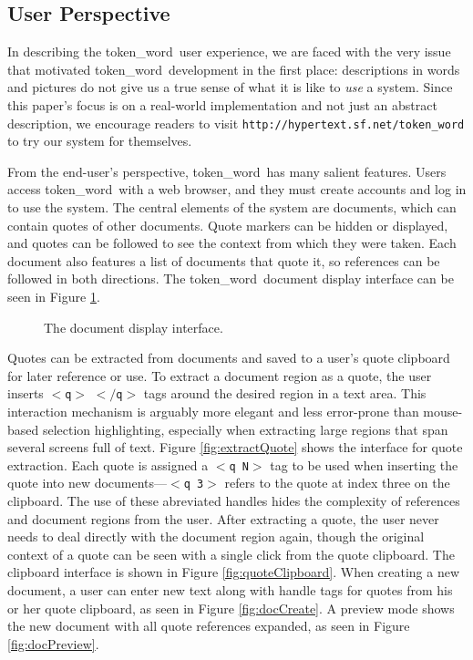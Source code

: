 \documentclass{acm_proc_article-sp}
\newcommand{\tw}{token\_word}
\begin{document}
\subsection{User Perspective}
In describing the \tw \  user experience, we are faced with the very issue that motivated \tw \  development in the first place:  descriptions in words and pictures do not give us a true sense of what it is like to \textit{use} a system.
Since this paper's focus is on a real-world implementation and not just an abstract description, we encourage readers to visit \texttt{http://hypertext.sf.net/token\_word} to try our system for themselves. 

From the end-user's perspective, \tw \  has many sal\-ient features.
Users access \tw \  with a web browser, and they must create accounts and log in to use the system.  
The central elements of the system are documents, which can contain quotes of other documents.
Quote markers can be hidden or displayed, and quotes can be followed to see the context from which they were taken.
Each document also features a list of documents that quote it, so references can be followed in both directions.
The \tw \   document display interface can be seen in Figure \ref{fig:mainScreen}.

\begin{figure}[t]
\centering
{}
\caption{The document display interface.}
\label{fig:mainScreen}
\end{figure}  

Quotes can be extracted from documents and saved to a user's quote clipboard for later reference or use.
To extract a document region as a quote, the user inserts $<$\texttt{q}$>$ $<$$/$\texttt{q}$>$ tags around the desired region in a text area.
This interaction mechanism is arguably more elegant and less error-prone than mouse-based selection highlighting, especially when extracting large regions that span several screens full of text.
Figure \ref{fig:extractQuote} shows the interface for quote extraction. 
Each quote is assigned a $<$\texttt{q N}$>$ tag to be used when inserting the quote into new documents---$<$\texttt{q 3}$>$ refers to the quote at index three on the clipboard.
The use of these abreviated handles hides the complexity of references and document regions from the user.
After extracting a quote, the user never needs to deal directly with the document region again, though the original context of a quote can be seen with a single click from the quote clipboard.
The clipboard interface is shown in Figure \ref{fig:quoteClipboard}.
When creating a new document, a user can enter new text along with handle tags for quotes from his or her quote clipboard, as seen in Figure \ref{fig:docCreate}.
A preview mode shows the new document with all quote references expanded, as seen in Figure \ref{fig:docPreview}.
\end{document}

